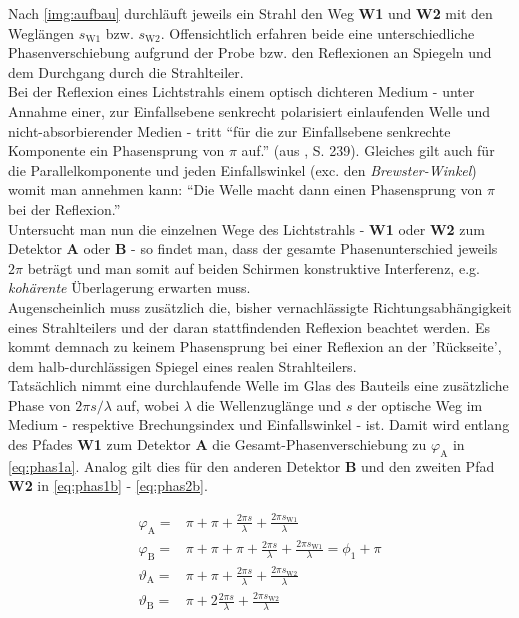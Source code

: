 \documentclass[numbers=noenddot,a4paper,notitlepage,twoside,BCOR15mm]{scrartcl}
\newcommand{\ix}[1]{_\text{#1}}
\newcommand{\tilt}[1]{\textit{#1}}
\newcommand{\fett}[1]{\textbf{#1}}
\begin{document}
				Nach \autoref{img:aufbau} durchläuft jeweils ein Strahl den Weg \fett{W1} und \fett{W2} mit den Weglängen $s\ix{W1}$ bzw. $s\ix{W2}$. Offensichtlich erfahren beide eine unterschiedliche Phasenverschiebung aufgrund der Probe bzw. den Reflexionen an Spiegeln und dem Durchgang durch die Strahlteiler.\\
				Bei der Reflexion eines Lichtstrahls einem optisch dichteren Medium - unter Annahme einer, zur Einfallsebene senkrecht polarisiert einlaufenden Welle und nicht-absorbierender Medien - tritt \enquote{für die zur Einfallsebene senkrechte Komponente ein Phasensprung von $\pi$ auf.} (aus \cite{MZdemt}, S. 239). Gleiches gilt auch für die Parallelkomponente und jeden Einfallswinkel (exc. den \tilt{Brewster-Winkel}) womit man annehmen kann: \enquote{Die Welle macht dann einen Phasensprung von $\pi$ bei der Reflexion.}\\
				Untersucht man nun die einzelnen Wege des Lichtstrahls - \fett{W1} oder \fett{W2} zum Detektor \fett{A} oder \fett{B} - so findet man, dass der gesamte Phasenunterschied jeweils $2\pi$ beträgt und man somit auf beiden Schirmen konstruktive Interferenz, e.g. \tilt{kohärente} Überlagerung  erwarten muss.\\
				Augenscheinlich muss zusätzlich die, bisher vernachlässigte Richtungsabhängigkeit eines Strahlteilers und der daran stattfindenden Reflexion beachtet werden. Es kommt demnach zu keinem Phasensprung bei einer Reflexion an der 'Rückseite', dem halb-durchlässigen Spiegel eines realen Strahlteilers.\\
				Tatsächlich nimmt eine durchlaufende Welle im Glas des Bauteils eine zusätzliche Phase von $2\pi s/\lambda$ auf, wobei $\lambda$ die Wellenzuglänge und $s$ der optische Weg im Medium - respektive Brechungsindex und Einfallswinkel - ist. Damit wird entlang des Pfades \fett{W1} zum Detektor \fett{A} die Gesamt-Phasenverschiebung zu $\varphi\ix{A}$ in \autoref{eq:phas1a}. Analog gilt dies für den anderen Detektor \fett{B} und den zweiten Pfad \fett{W2} in \autoref{eq:phas1b} - \autoref{eq:phas2b}.

					\begin{align}
						\varphi\ix{A}=&\pi+\pi+\frac{2\pi s}{\lambda}+\frac{2\pi s\ix{W1}}{\lambda} \label{eq:phas1a} \\
						\varphi\ix{B}=&\pi+\pi+\pi+\frac{2\pi s}{\lambda}+\frac{2\pi s\ix{W1}}{\lambda}=\phi\ix{1}+\pi \label{eq:phas1b} \\
						\vartheta\ix{A}=&\pi+\pi+\frac{2\pi s}{\lambda}+\frac{2\pi s\ix{W2}}{\lambda} \label{eq:phas2a} \\
						\vartheta\ix{B}=&\pi+2\frac{2\pi s}{\lambda}+\frac{2\pi s\ix{W2}}{\lambda} \label{eq:phas2b}
					\end{align}
\end{document}
